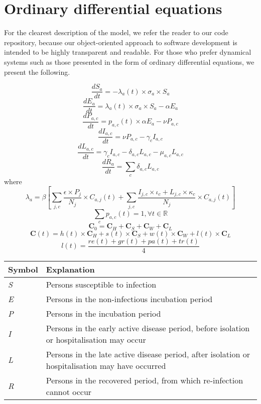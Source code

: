 \section{Ordinary differential equations}

For the clearest description of the model, we refer the reader to our code repository, because our object-oriented approach to software development is intended to be highly transparent and readable. For those who prefer dynamical systems such as those presented in the form of ordinary differential equations, we present the following.

    
    \[\frac{dS_{a}}{dt}=-\lambda_{a}(t)\times\sigma_{a}\times S_{a}\]
    \[\frac{dE_{a}}{dt}=\lambda_{a}(t)\times\sigma_{a}\times S_{a}-\alpha E_{a}\]
    \[\frac{dP_{a,c}}{dt}=p_{a,c}(t)\times \alpha E_{a}-\nu P_{a,c}\]
    \[\frac{dI_{a,c}}{dt}=\nu P_{a,c}-\gamma_{c}I_{a,c}\]
    \[\frac{dL_{a,c}}{dt}=\gamma_{c}I_{a,c}-\delta_{a,c}L_{a,c}-\mu_{a,c}L_{a,c}\]
    \[\frac{dR_{a}}{dt}=\sum_{c}{}\delta_{a,c}L_{a,c}\]
    where
    \[\lambda_{a}=\beta\left[\sum_{j,c}\frac{\epsilon\times P_{j}}{N_{j}}\times C_{a,j}(t)+\sum_{j,c}\frac{I_{j,c}\times\iota_{c}+L_{j,c}\times\kappa_{c}}{N_{j}}\times C_{a,j}(t)\right]\]
    \[\sum_{c}p_{a,c}(t)=1,\forall t\in\mathbb{R}\]
    \[\textbf{C}_{0}=\textbf{C}_{H}+\textbf{C}_{S}+\textbf{C}_{W}+\textbf{C}_{L}\]
    \[\textbf{C}(t)=h(t)\times\textbf{C}_{H}+s(t)\times\textbf{C}_{S}+w(t)\times\textbf{C}_{W}+l(t)\times\textbf{C}_{L}\]
    \[l(t)=\frac{re(t)+gr(t)+pa(t)+tr(t)}{4}\]
    
\begin{table}[t] 

    \begin{tabular}{| p{3.4cm} | p{10.4cm} |}
        \hline
        \textbf{Symbol} & \textbf{Explanation} \\
        \hline
        \textit{S} & Persons susceptible to infection \\
   		\textit{E} & Persons in the non-infectious incubation period \\
    	\textit{P} & Persons in the incubation period \\
   		\textit{I} & Persons in the early active disease period, before isolation or 			   			hospitalisation may occur \\
    	\textit{L} & Persons in the late active disease period, after isolation or hospitalisation 			may have occurred \\
    	\textit{R} & Persons in the recovered period, from which re-infection cannot occur\\
     	\hline
    \end{tabular}

\end{table}

